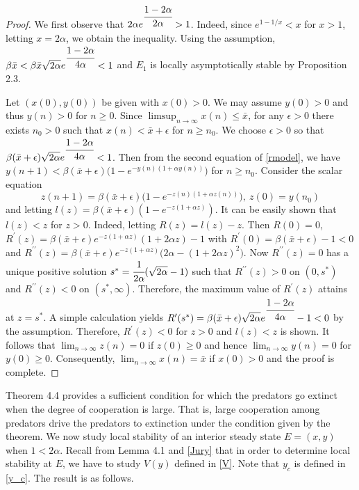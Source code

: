 \documentclass[11pt]{article}
\begin{document}
\begin{proof} We first observe that
$2\alpha e^{\cfrac{1-2\alpha}{2\alpha}}>1$. Indeed, since
$e^{1-1/x}<x$ for $x>1$, letting $x=2\alpha$, we obtain the
inequality. Using the assumption,  $\beta \bar x<\beta \bar x
\sqrt{2\alpha}e^{\cfrac{1-2\alpha}{4\alpha}}<1$  and $E_1$ is
locally asymptotically stable by Proposition 2.3.


Let $(x(0),y(0))$ be given with $x(0)>0$. We may assume $y(0)>0$
and thus $y(n)>0$ for $n\geq 0$. Since
$\limsup_{n\rightarrow\infty}x(n)\leq \bar x$, for any
$\epsilon>0$ there exists $n_0>0$ such that $x(n)<\bar x+\epsilon$
for $n\geq n_0$. We choose $\epsilon>0$ so that $\beta (\bar
x+\epsilon) \sqrt{2\alpha}e^{\cfrac{1-2\alpha}{4\alpha}}<1$. Then
from the second equation of \eqref{rmodel}, we have
$y(n+1)<\beta(\bar x+\epsilon)\bigg(1-e^{-y(n)(1+\alpha
y(n))}\bigg)$ for $n\geq n_0$. Consider the scalar equation
\begin{equation}
z(n+1)=\beta(\bar x+\epsilon)\bigg(1-e^{-z(n)(1+\alpha
z(n))}\bigg), \ z(0)=y(n_0)
\end{equation}
and letting $l(z)=\beta(\bar x+\epsilon)(1-e^{-z(1+\alpha z)})$.
It can be easily shown that $l(z)<z$ for $z>0$. Indeed, letting
$R(z)=l(z)-z$. Then $R(0)=0$, $R^\prime(z)=\beta (\bar
x+\epsilon)e^{-z(1+\alpha z)}(1+2\alpha z)-1$ with
$R^\prime(0)=\beta (\bar x+\epsilon)-1<0$ and
$R^{\prime\prime}(z)=\beta (\bar x+\epsilon)e^{-z(1+\alpha
z)}\bigg(2\alpha-(1+2\alpha z)^2\bigg)$. Now
$R^{\prime\prime}(z)=0$ has a unique positive solution
$s^*=\cfrac{1}{2\alpha}(\sqrt{2\alpha}-1)$ such that
$R^{\prime\prime}(z)>0$ on $(0, s^*)$ and $R^{\prime\prime}(z)<0$
 on $(s^*, \infty)$. Therefore, the maximum value
of $R^\prime(z)$ attains at $z=s^*$.  A simple calculation yields
$R^\prime(s^*)=\beta  (\bar
x+\epsilon)\sqrt{2\alpha}e^{\cfrac{1-2\alpha}{4\alpha}}-1<0$ by
the assumption. Therefore, $R^\prime(z)<0$ for $z>0$ and $l(z)<z$
is shown. It follows that $\lim_{n\rightarrow\infty}z(n)=0$ if
$z(0)\geq 0$ and hence $\lim_{n\rightarrow\infty}y(n)=0$ for
$y(0)\geq 0$. Consequently, $\lim_{n\rightarrow\infty}x(n)=\bar x$
if $x(0)>0$ and the proof is complete. \end{proof}


Theorem 4.4 provides a sufficient condition for which the
predators go extinct when the degree of cooperation is large. That
is, large cooperation among predators drive the predators to
extinction under the condition given by the theorem.  We now study
local stability of an interior steady state $E=(x,y)$ when
$1<2\alpha$. Recall from Lemma 4.1 and \eqref{Jury} that in order
to determine local stability at $E$, we have to study $V(y)$
defined in \eqref{V}. Note that $y_c$ is defined in \eqref{y_c}.
The result is  as follows.
\end{document}
